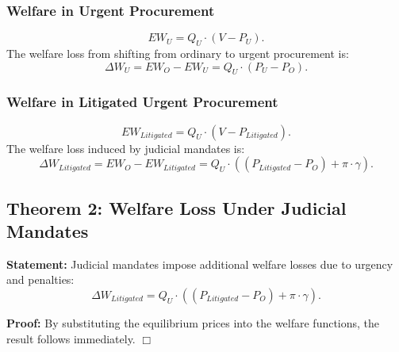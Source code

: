 \subsubsection{Welfare in Urgent Procurement}
\[
EW_U = Q_U \cdot (V - P_U).
\]
The welfare loss from shifting from ordinary to urgent procurement is:
\[
\Delta W_U = EW_O - EW_U = Q_U \cdot (P_U - P_O).
\]

\subsubsection{Welfare in Litigated Urgent Procurement}
\[
EW_{Litigated} = Q_U \cdot (V - P_{Litigated}).
\]
The welfare loss induced by judicial mandates is:
\[
\Delta W_{Litigated} = EW_O - EW_{Litigated} = Q_U \cdot \left((P_{Litigated} - P_O) + \pi \cdot \gamma \right).
\]

\subsection{Theorem 2: Welfare Loss Under Judicial Mandates}

\textbf{Statement:} Judicial mandates impose additional welfare losses due to urgency and penalties:
\[
\Delta W_{Litigated} = Q_U \cdot \left((P_{Litigated} - P_O) + \pi \cdot \gamma \right).
\]

\textbf{Proof:} By substituting the equilibrium prices into the welfare functions, the result follows immediately. \(\Box\)
